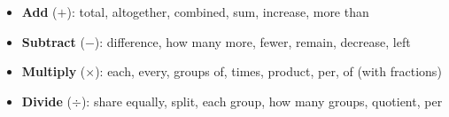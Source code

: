 {%
\begin{tcolorbox}[
    enhanced,
    colback=funOrangeLight,
    colframe=funOrange!50,
    arc=10pt,
    boxrule=1.5pt,
    left=5mm, right=5mm, top=3mm, bottom=3mm,
    title={\textcolor{white}{\faSearch~Word Problem Clue Words}},
    colbacktitle=funOrange!70,
    fonttitle=\bfseries\sffamily,
]
    \small
    \begin{multicols}{2}
    \begin{itemize}[leftmargin=*, itemsep=2pt]
        \item \textbf{Add} ($+$): total, altogether, combined, sum, increase, more than
        \item \textbf{Subtract} ($-$): difference, how many more, fewer, remain, decrease, left
        \item \textbf{Multiply} ($\times$): each, every, groups of, times, product, per, of (with fractions)
        \item \textbf{Divide} ($\div$): share equally, split, each group, how many groups, quotient, per
    \end{itemize}
    \end{multicols}
\end{tcolorbox}

}

\newpage
